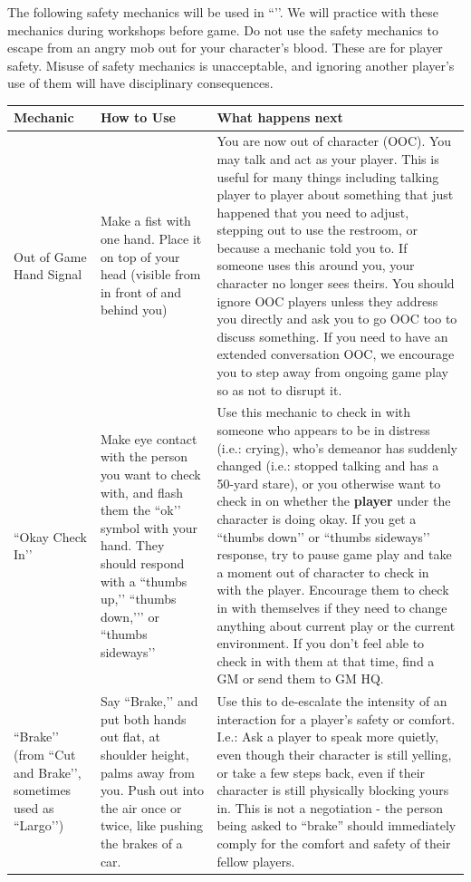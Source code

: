 \documentclass[sheet]{GL2020}
\begin{document}
The following safety mechanics will be used in ``\gamename{}’’. We will practice with these mechanics during workshops before game. Do not use the safety mechanics to escape from an angry mob out for your character’s blood. These are for player safety. Misuse of safety mechanics is unacceptable, and ignoring another player’s use of them will have disciplinary consequences.

\begin{tabularx}{\textwidth}{|>{\centering\arraybackslash} m{1.5cm} | >{\centering\arraybackslash} m{1.8cm} | >{\centering\arraybackslash}X |}
\hline 
 \textbf{Mechanic} & \textbf{How to Use} & \textbf{What happens next} \\
\hline
Out of Game Hand Signal & Make a fist with one hand. Place it on top of your head (visible from in front of and behind you) & You are now out of character (OOC). You may talk and act as your player. This is useful for many things including talking player to player about something that just happened that you need to adjust, stepping out to use the restroom, or because a mechanic told you to. If someone uses this around you, your character no longer sees theirs. You should ignore OOC players unless they address you directly and ask you to go OOC too to discuss something. If you need to have an extended conversation OOC, we encourage you to step away from ongoing game play so as not to disrupt it. \\
    \hline
``Okay Check In’’ & Make eye contact with the person you want to check with, and flash them the ``ok’’ symbol with your hand. They should respond with a ``thumbs up,’’ ``thumbs down,’’’ or ``thumbs sideways’’ & Use this mechanic to check in with someone who appears to be in distress (i.e.: crying), who’s demeanor has suddenly changed (i.e.: stopped talking and has a 50-yard stare), or you otherwise want to check in on whether the \textbf{player} under the character is doing okay. If you get a ``thumbs down’’ or ``thumbs sideways’’ response, try to pause game play and take a moment out of character to check in with the player. Encourage them to check in with themselves if they need to change anything about current play or the current environment. If you don’t feel able to check in with them at that time, find a GM or send them to GM HQ.\\
    \hline
``Brake’’ (from ``Cut and Brake’’, sometimes used as ``Largo’’) & Say ``Brake,’’ and put both hands out flat, at shoulder height, palms away from you. Push out into the air once or twice, like pushing the brakes of a car. & Use this to de-escalate the intensity of an interaction for a player’s safety or comfort. I.e.: Ask a player to speak more quietly, even though their character is still yelling, or take a few steps back, even if their character is still physically blocking yours in. This is not a negotiation - the person being asked to ``brake'' should immediately comply for the comfort and safety of their fellow players. \\

\end{tabularx}
\end{document}

